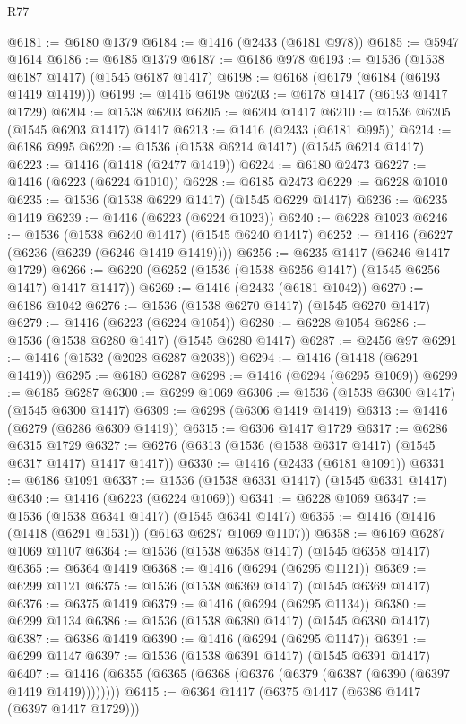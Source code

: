 \begin{lexlean}{R77}
\begin{coremodule}
{{@6181 := @6180 @1379
@6184 := @1416 (@2433 (@6181 @978))
@6185 := @5947 @1614
@6186 := @6185 @1379
@6187 := @6186 @978
@6193 := @1536 (@1538 @6187 @1417) (@1545 @6187 @1417)
@6198 := @6168 (@6179 (@6184 (@6193 @1419 @1419)))
@6199 := @1416 @6198
@6203 := @6178 @1417 (@6193 @1417 @1729)
@6204 := @1538 @6203
@6205 := @6204 @1417
@6210 := @1536 @6205 (@1545 @6203 @1417) @1417
@6213 := @1416 (@2433 (@6181 @995))
@6214 := @6186 @995
@6220 := @1536 (@1538 @6214 @1417) (@1545 @6214 @1417)
@6223 := @1416 (@1418 (@2477 @1419))
@6224 := @6180 @2473
@6227 := @1416 (@6223 (@6224 @1010))
@6228 := @6185 @2473
@6229 := @6228 @1010
@6235 := @1536 (@1538 @6229 @1417) (@1545 @6229 @1417)
@6236 := @6235 @1419
@6239 := @1416 (@6223 (@6224 @1023))
@6240 := @6228 @1023
@6246 := @1536 (@1538 @6240 @1417) (@1545 @6240 @1417)
@6252 := @1416 (@6227 (@6236 (@6239 (@6246 @1419 @1419))))
@6256 := @6235 @1417 (@6246 @1417 @1729)
@6266 := @6220 (@6252 (@1536 (@1538 @6256 @1417) (@1545 @6256 @1417) @1417 @1417))
@6269 := @1416 (@2433 (@6181 @1042))
@6270 := @6186 @1042
@6276 := @1536 (@1538 @6270 @1417) (@1545 @6270 @1417)
@6279 := @1416 (@6223 (@6224 @1054))
@6280 := @6228 @1054
@6286 := @1536 (@1538 @6280 @1417) (@1545 @6280 @1417)
@6287 := @2456 @97
@6291 := @1416 (@1532 (@2028 @6287 @2038))
@6294 := @1416 (@1418 (@6291 @1419))
@6295 := @6180 @6287
@6298 := @1416 (@6294 (@6295 @1069))
@6299 := @6185 @6287
@6300 := @6299 @1069
@6306 := @1536 (@1538 @6300 @1417) (@1545 @6300 @1417)
@6309 := @6298 (@6306 @1419 @1419)
@6313 := @1416 (@6279 (@6286 @6309 @1419))
@6315 := @6306 @1417 @1729
@6317 := @6286 @6315 @1729
@6327 := @6276 (@6313 (@1536 (@1538 @6317 @1417) (@1545 @6317 @1417) @1417 @1417))
@6330 := @1416 (@2433 (@6181 @1091))
@6331 := @6186 @1091
@6337 := @1536 (@1538 @6331 @1417) (@1545 @6331 @1417)
@6340 := @1416 (@6223 (@6224 @1069))
@6341 := @6228 @1069
@6347 := @1536 (@1538 @6341 @1417) (@1545 @6341 @1417)
@6355 := @1416 (@1416 (@1418 (@6291 @1531)) (@6163 @6287 @1069 @1107))
@6358 := @6169 @6287 @1069 @1107
@6364 := @1536 (@1538 @6358 @1417) (@1545 @6358 @1417)
@6365 := @6364 @1419
@6368 := @1416 (@6294 (@6295 @1121))
@6369 := @6299 @1121
@6375 := @1536 (@1538 @6369 @1417) (@1545 @6369 @1417)
@6376 := @6375 @1419
@6379 := @1416 (@6294 (@6295 @1134))
@6380 := @6299 @1134
@6386 := @1536 (@1538 @6380 @1417) (@1545 @6380 @1417)
@6387 := @6386 @1419
@6390 := @1416 (@6294 (@6295 @1147))
@6391 := @6299 @1147
@6397 := @1536 (@1538 @6391 @1417) (@1545 @6391 @1417)
@6407 := @1416 (@6355 (@6365 (@6368 (@6376 (@6379 (@6387 (@6390 (@6397 @1419 @1419))))))))
@6415 := @6364 @1417 (@6375 @1417 (@6386 @1417 (@6397 @1417 @1729)))
}}
\end{coremodule}
\end{lexlean}
